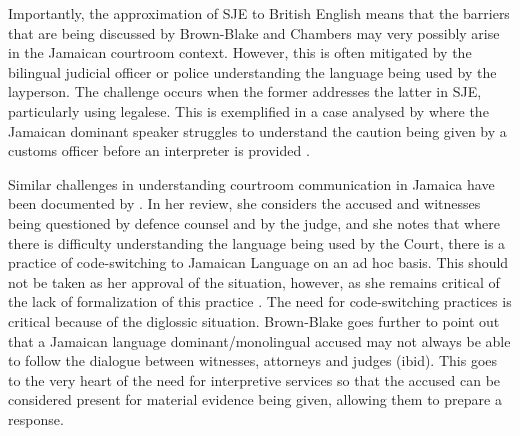 \documentclass[output=paper,colorlinks,citecolor=brown]{langscibook}
\begin{document}
Importantly, the approximation of SJE to British English means that the barriers that are being discussed by Brown-Blake and Chambers may very possibly arise in the Jamaican courtroom context. However, this is often mitigated by the bilingual judicial officer or police understanding the language being used by the layperson. The challenge occurs when the former addresses the latter in SJE, particularly using legalese. This is exemplified in a case analysed by \citeauthor{Brown-BlakeChambers2007} where the Jamaican dominant speaker struggles to understand the caution being given by a customs officer before an interpreter is provided \citep[280--285]{Brown-BlakeChambers2007}. 

\begin{sloppypar}
Similar challenges in understanding courtroom communication in Jamaica have been documented by \citet{BrownBlake2017}. In her review, she considers the accused and witnesses being questioned by defence counsel and by the judge, and she notes that where there is difficulty understanding the language being used by the Court, there is a practice of code-switching to Jamaican Language on an ad hoc basis. This should not be taken as her approval of the situation, however, as she remains critical of the lack of formalization of this practice \citep[200]{BrownBlake2017}. The need for code-switching practices is critical because of the diglossic situation. Brown-Blake goes further to point out that a Jamaican language dominant/monolingual accused may not always be able to follow the dialogue between witnesses, attorneys and judges (ibid). This goes to the very heart of the need for interpretive services so that the accused can be considered present for material evidence being given, allowing them to prepare a response.
\end{sloppypar}
\end{document}
